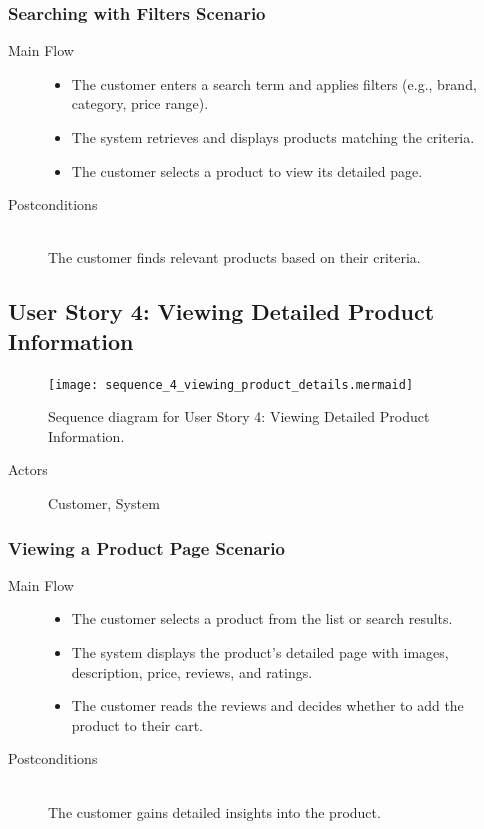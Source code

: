 \documentclass[twoside,a4paper,journal]{IEEEtran}
\begin{document}
\subsubsection{Searching with Filters Scenario}
\begin{description}
  \item[Main Flow] \hfill
    \begin{itemize}
      \item The customer enters a search term and applies filters
        (e.g., brand, category, price range).
      \item The system retrieves and displays products matching the criteria.
      \item The customer selects a product to view its detailed page.
    \end{itemize}
  \item[Postconditions] \hfill \\
    The customer finds relevant products based on their criteria.
\end{description}

\subsection{User Story 4: Viewing Detailed Product Information}
\begin{figure}[!t]
\centering
\texttt{[image: sequence\_4\_viewing\_product\_details.mermaid]}
\caption{Sequence diagram for User Story 4: Viewing Detailed Product Information.}
\label{fig:sequence_4}
\end{figure}
\begin{description}
  \item[Actors] Customer, System
\end{description}
\subsubsection{Viewing a Product Page Scenario}
\begin{description}
  \item[Main Flow] \hfill
    \begin{itemize}
      \item The customer selects a product from the list or search results.
      \item The system displays the product's detailed page with images,
        description, price, reviews, and ratings.
      \item The customer reads the reviews and decides whether to add the
        product to their cart.
    \end{itemize}
  \item[Postconditions] \hfill \\
    The customer gains detailed insights into the product.
\end{description}
\end{document}
